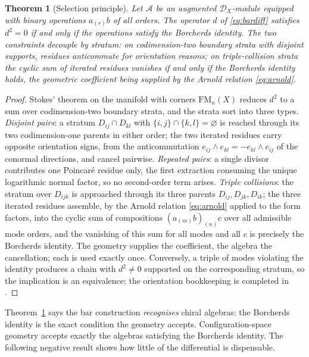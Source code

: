 \documentclass[11pt]{amsart}
\numberwithin{equation}{section}
\theoremstyle{plain}
\newtheorem{theorem}{Theorem}[section]
\theoremstyle{definition}
\theoremstyle{remark}
\newcommand{\cA}{\mathcal{A}}
\newcommand{\FM}{\mathrm{FM}}
\begin{document}
\begin{theorem}[Selection principle]\label{thm:selection}
Let $\cA$ be an augmented $\mathcal{D}_X$-module equipped with binary
operations $a_{(r)}b$ of all orders. The operator $d$
of \eqref{eq:bardiff} satisfies $d^{2}=0$ if and only if the operations
satisfy the Borcherds identity. The two constraints decouple by stratum:
on codimension-two boundary strata with disjoint supports, residues
anticommute for orientation reasons; on triple-collision strata the cyclic
sum of iterated residues vanishes if and only if the Borcherds identity
holds, the geometric coefficient being supplied by the Arnold
relation \eqref{eq:arnold}.
\end{theorem}

\begin{proof}
Stokes' theorem on the manifold with corners $\FM_n(X)$ reduces
$d^{2}$ to a sum over codimension-two boundary strata, and the strata
sort into three types. \emph{Disjoint pairs}: a stratum
$D_{ij}\cap D_{kl}$ with $\{i,j\}\cap\{k,l\}=\varnothing$ is reached
through its two codimension-one parents in either order; the two
iterated residues carry opposite orientation signs, from the
anticommutation $e_{ij}\wedge e_{kl}=-e_{kl}\wedge e_{ij}$ of the
conormal directions, and cancel pairwise. \emph{Repeated pairs}: a
single divisor contributes one Poincar\'e residue only, the first
extraction consuming the unique logarithmic normal factor, so no
second-order term arises. \emph{Triple collisions}: the stratum over
$D_{ijk}$ is approached through its three parents
$D_{ij}, D_{jk}, D_{ik}$; the three iterated residues assemble, by
the Arnold relation \eqref{eq:arnold} applied to the form factors,
into the cyclic sum of compositions
$(a_{(m)}b)_{(n)}c$ over all admissible mode orders, and the
vanishing of this sum for all modes and all $c$ is precisely the
Borcherds identity. The geometry supplies the coefficient, the
algebra the cancellation; each is used exactly once. Conversely, a
triple of modes violating the identity produces a chain with
$d^{2}\neq0$ supported on the corresponding stratum, so the
implication is an equivalence; the orientation bookkeeping is
completed in \cite{Vol1}.
\end{proof}

Theorem~\ref{thm:selection} says the bar construction \emph{recognises} chiral
algebras: the Borcherds identity is the exact condition the geometry
accepts. Configuration-space geometry
accepts exactly the algebras satisfying the Borcherds identity. The
following negative result shows how little of the differential is dispensable.
\end{document}
